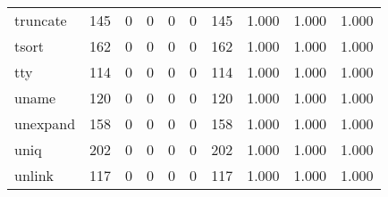 \begin{longtable}{lp{1.3cm}p{1.3cm}p{1.3cm}p{1.3cm}p{1.3cm}p{1.3cm}p{1.3cm}p{1.3cm}p{1.3cm}}
truncate  &                    145 &                                  0 &                                 0 &                                0 &                                 0 &                             145 &                                   1.000 &                                  1.000 &                                1.000 \\
tsort     &                    162 &                                  0 &                                 0 &                                0 &                                 0 &                             162 &                                   1.000 &                                  1.000 &                                1.000 \\
tty       &                    114 &                                  0 &                                 0 &                                0 &                                 0 &                             114 &                                   1.000 &                                  1.000 &                                1.000 \\
uname     &                    120 &                                  0 &                                 0 &                                0 &                                 0 &                             120 &                                   1.000 &                                  1.000 &                                1.000 \\
unexpand  &                    158 &                                  0 &                                 0 &                                0 &                                 0 &                             158 &                                   1.000 &                                  1.000 &                                1.000 \\
uniq      &                    202 &                                  0 &                                 0 &                                0 &                                 0 &                             202 &                                   1.000 &                                  1.000 &                                1.000 \\
unlink    &                    117 &                                  0 &                                 0 &                                0 &                                 0 &                             117 &                                   1.000 &                                  1.000 &                                1.000 \\

\end{longtable}
